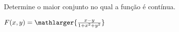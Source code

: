 
Determine o maior conjunto no qual a função é contínua.

$ F(x,y)=\mathlarger{\frac{x-y}{1+x^2+y^2}}$